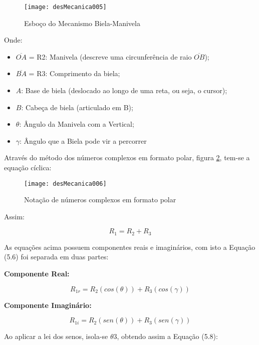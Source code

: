 		\begin{figure}[!h]
			\centering
			\texttt{[image: desMecanica005]}
			\caption{Esboço do Mecanismo Biela-Manivela}
			\label{desMecanica005}
		\end{figure}

		Onde:
		\begin{itemize}
			\item $ \overline{OA} $ = R2: Manivela (descreve uma circunferência de raio $ \overline{OB} $);
			\item $ \overline{BA} $ = R3: Comprimento da biela; 
			\item $A$: Base de biela (deslocado ao longo de uma reta, ou seja, o cursor);
			\item $B$: Cabeça de biela (articulado em B);
			\item $\theta$: Ângulo da Manivela com a Vertical;
			\item $\gamma$: Ângulo que a Biela pode vir a percorrer
		\end{itemize}

		Através do método dos números complexos em formato polar, figura \ref{desMecanica006}, tem-se a equação cíclica:

		\begin{figure}[h]
			\centering
			\texttt{[image: desMecanica006]}
			\caption{Notação de números complexos em formato polar}
			\label{desMecanica006}
		\end{figure}

		Assim:

		\begin{equation}
			R_{1} = R_{2} + R_{3}
		\end{equation}

		As equações acima possuem componentes reais e imaginários, com isto a Equação (5.6) foi separada em duas partes: 

		\textbf{Componente Real:}

		\begin{equation}
			R_{1r} = R_{2}(cos(\theta)) + R_{3}(cos(\gamma))
		\end{equation}

		\textbf{Componente Imaginário:}

		\begin{equation}
			R_{1i} = R_{2}(sen(\theta)) + R_{3}(sen(\gamma))
		\end{equation}

		Ao aplicar a lei dos senos, isola-se $\theta{3}$, obtendo assim a Equação (5.8):

